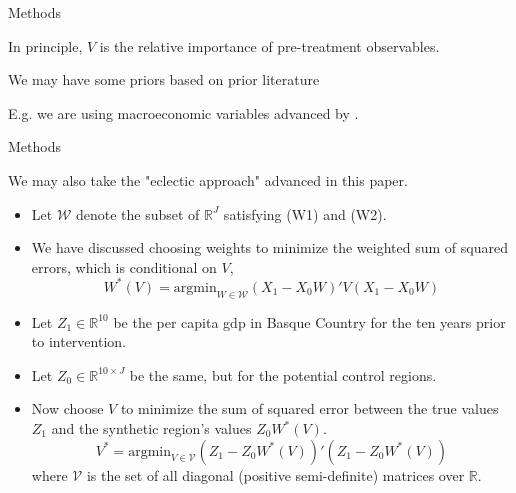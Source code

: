 \documentclass[notes,11pt, aspectratio=169]{beamer}
\newenvironment{wideitemize}{\itemize\addtolength{\itemsep}{10pt}}{\enditemize}
\begin{document}
\begin{frame}{Methods}
    \begin{wideitemize}
        \item In principle, $V$ is the relative importance of pre-treatment observables. 
        \item We may have some priors based on prior literature \medskip
        \begin{wideitemize}
            \item E.g. we are using macroeconomic variables advanced by \cite{barro_economic_2004}. 
        \end{wideitemize}
    \end{wideitemize}    
\end{frame}

\begin{frame}{Methods}
     
        We may also take the "eclectic approach" advanced in this paper. \pause 
    
    \begin{itemize}
    
            \item Let $\mathcal W$ denote the subset of $\mathbb R^J$ satisfying (W1) and (W2). \pause 
            
            \item We have discussed choosing weights to minimize the weighted sum of squared errors, which is conditional on $V$,
            \[ W^*(V) = \text{argmin}_{W \in \mathcal W} (X_1 - X_0 W)' V (X_1 - X_0 W) \] \pause 
            
            \item Let $Z_1 \in \mathbb R^{10}$ be the per capita gdp in Basque Country for the ten years prior to intervention. 
            
            \item Let $Z_0 \in \mathbb R^{10\times J}$ be the same, but for the potential control regions. \pause 
            
            \item Now choose $V$ to minimize the sum of squared error between the true values $Z_1$ and the synthetic region's values $Z_0 W^*(V)$. 
            \[ V^* = \text{argmin}_{V \in \mathcal V} (Z_1 - Z_0 W^*(V) )' (Z_1 - Z_0 W^*(V) ) \]
            where $\mathcal V$ is the set of all diagonal (positive semi-definite) matrices over $\mathbb R$. 
        
    \end{itemize}    
    
\end{frame}
\end{document}
